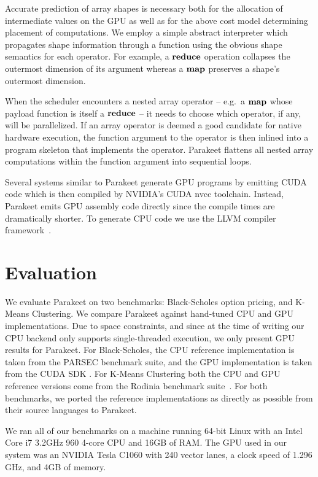 \documentclass[10pt,twocolumn]{article}
\begin{document}
Accurate prediction of array shapes is necessary both for the allocation of intermediate values on the GPU as well as for the above cost model determining placement of computations. We employ a simple abstract interpreter which propagates shape information through a function using the obvious shape semantics for each operator. For example, a $\mbox{\textbf{reduce}}$ operation collapses the outermost dimension of its argument whereas a $\mbox{\textbf{map}}$ preserves a shape's outermost dimension.

When the scheduler encounters a nested array operator -- e.g.~a $\mbox{\textbf{map}}$ whose payload function is itself a $\mbox{\textbf{reduce}}$ -- it needs to choose which operator, if any, will be parallelized.  If an array operator is deemed a good candidate for native hardware execution, the function argument to the operator is then inlined into a program skeleton that implements the operator. Parakeet flattens all nested array computations within the function argument into sequential loops.

Several systems similar to Parakeet \cite{Cata11,Chaf11} generate GPU programs by emitting CUDA code which is then compiled by NVIDIA's CUDA nvcc toolchain. Instead, Parakeet emits GPU assembly code directly since the compile times are dramatically shorter. To generate CPU code we use the LLVM compiler framework~\cite{Latt02}.

\section{Evaluation}
\label{Evaluation}

We evaluate Parakeet on two benchmarks: Black-Scholes option pricing, and K-Means Clustering.  We compare Parakeet against hand-tuned CPU and GPU implementations.  Due to space constraints, and since at the time of writing our CPU backend only supports single-threaded execution, we only present GPU results for Parakeet.  For Black-Scholes, the CPU reference implementation is taken from the PARSEC \cite{Bien08} benchmark suite, and the GPU implementation is taken from the CUDA SDK \cite{NvidSD}.  For K-Means Clustering both the CPU and GPU reference versions come from the Rodinia benchmark suite~\cite{Che09}.  For both benchmarks, we ported the reference implementations as directly as possible from their source languages to Parakeet.

We ran all of our benchmarks on a machine running 64-bit Linux with an Intel Core i7 3.2GHz 960 4-core CPU  and 16GB of RAM.  The GPU used in our system was an NVIDIA Tesla C1060 with 240 vector lanes, a clock speed of 1.296 GHz, and 4GB of memory.
\end{document}

